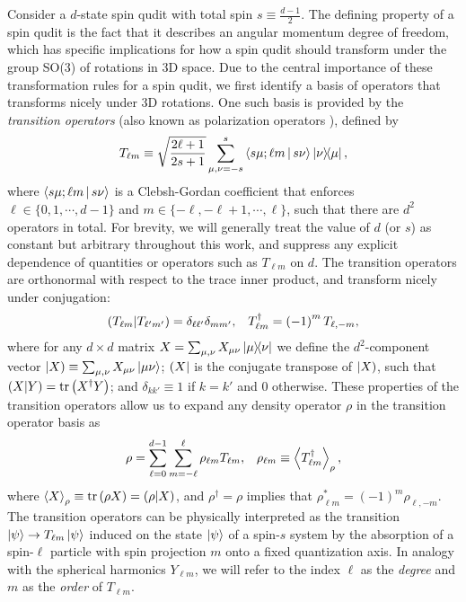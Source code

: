 \documentclass[notitlepage,twocolumn]{revtex4-2}
\newcommand{\f}[2]{\dfrac{#1}{#2}} %
\newcommand{\p}[1]{\left(#1\right)} %
\newcommand{\bk}{\Braket} %
\renewcommand{\set}[1]{\{#1\}} %
\def\obra#1{\mathinner{({#1}|}}
\def\oket#1{\mathinner{|{#1})}}
\def\obk#1{\mathinner{({#1})}}
\newcommand{\1}{\mathds{1}}
\begin{document}
Consider a $d$-state spin qudit with total spin $s\equiv\frac{d-1}{2}$.
The defining property of a spin qudit is the fact that it describes an angular momentum degree of freedom, which has specific implications for how a spin qudit should transform under the group SO(3) of rotations in 3D space.
Due to the central importance of these transformation rules for a spin qudit, we first identify a basis of operators that transforms nicely under 3D rotations.
One such basis is provided by the {\it transition operators} (also known as polarization operators \cite{kryszewski2006positivity, bertlmann2008bloch}), defined by
\begin{align}
  T_{\ell m} \equiv \sqrt{\f{2\ell+1}{2s+1}} \sum_{\mu,\nu=-s}^s
  \bk{s\mu;\ell m|s\nu} \op{\nu}{\mu},
  \label{eq:trans_op}
\end{align}
where $\bk{s\mu;\ell m|s\nu}$ is a Clebsh-Gordan coefficient that enforces $\ell\in\set{0,1,\cdots,d-1}$ and $m\in\set{-\ell,-\ell+1,\cdots,\ell}$, such that there are $d^2$ operators in total.
For brevity, we will generally treat the value of $d$ (or $s$) as constant but arbitrary throughout this work, and suppress any explicit dependence of quantities or operators such as $T_{\ell m}$ on $d$.
The transition operators are orthonormal with respect to the trace inner product, and transform nicely under conjugation:
\begin{align}
  \obk{T_{\ell m }|T_{\ell'm'}}
  = \delta_{\ell\ell'} \delta_{mm'},
  &&
  T_{\ell m}^\dag = \p{-1}^m T_{\ell,-m},
\end{align}
where for any $d\times d$ matrix $X=\sum_{\mu,\nu} X_{\mu\nu} \op{\mu}{\nu}$ we define the $d^2$-component vector $\oket{X} \equiv \sum_{\mu,\nu} X_{\mu\nu} \ket{\mu\nu}$; $\obra{X}$ is the conjugate transpose of $\oket{X}$, such that $\obk{X|Y}=\tr\p{X^\dag Y}$; and $\delta_{kk'}\equiv 1$ if $k=k'$ and $0$ otherwise.
These properties of the transition operators allow us to expand any density operator $\rho$ in the transition operator basis as
\begin{align}
  \rho = \sum_{\ell=0}^{d-1} \sum_{m=-\ell}^\ell
  \rho_{\ell m} T_{\ell m},
  &&
  \rho_{\ell m} \equiv \bk{T_{\ell m}^\dag}_\rho,
  \label{eq:trans_state}
\end{align}
where $\bk{X}_\rho\equiv\tr\p{\rho X}=\obk{\rho|X}$, and $\rho^\dag=\rho$ implies that $\rho_{\ell m}^*=\p{-1}^m\rho_{\ell,-m}$.
The transition operators can be physically interpreted as the transition $\ket\psi\to T_{\ell m}\ket\psi$ induced on the state $\ket\psi$ of a spin-$s$ system by the absorption of a spin-$\ell$ particle with spin projection $m$ onto a fixed quantization axis.
In analogy with the spherical harmonics $Y_{\ell m}$, we will refer to the index $\ell$ as the {\it degree} and $m$ as the {\it order} of $T_{\ell m}$.
\end{document}
